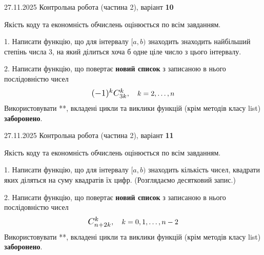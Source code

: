 \documentclass[11pt, ukrainian]{article}
\begin{document}
{{{{{{{{{\begin {large}
\end{large}
\newpage
{{27.11.2025 Контрольна робота  (частина 2), варіант  \No \textbf { 10 }\par}}


{
\begin {large}
Якість коду та економність обчислень оцінюється по всім завданням.


1. Написати функцію, що для інтервалу $[a, b)$ знаходить знаходить найбільший степінь числа 3, на який ділиться хоча б одне ціле число з цього інтервалу.


2. 
Написати функцію, що повертає \textbf{новий список} з записаною в нього послідовністю чисел
$$\scalebox{1.2}{$(-1)^{k}C_{3k}^{k}$}, \quad k=2,\ldots,n$$
Використовувати **, вкладені цикли та виклики функцій (крім методів класу list) \textbf{заборонено}.

\end{large}
\newpage
{{27.11.2025 Контрольна робота  (частина 2), варіант  \No \textbf { 11 }\par}}


{
\begin {large}
Якість коду та економність обчислень оцінюється по всім завданням.


1. Написати функцію, що для інтервалу $[a, b)$ знаходить кількість чисел, квадрати яких діляться на суму квадратів їх цифр. (Розглядаємо десятковий запис.)


2. 
Написати функцію, що повертає \textbf{новий список} з записаною в нього послідовністю чисел
$$\scalebox{1.2}{$C_{n+2k}^{k}$}, \quad k=0,1,\ldots,n-2$$
Використовувати **, вкладені цикли та виклики функцій (крім методів класу list) \textbf{заборонено}.


\end{large}}}}}}}}}}}}
\end{document}
